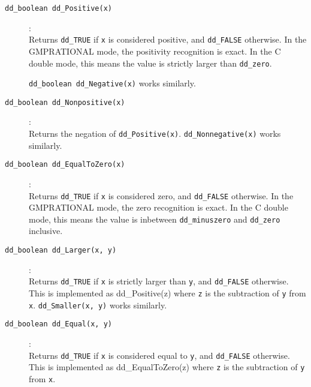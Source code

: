 \documentclass[11pt]{article}
\newcommand {\0} {{\bf 0}}
\begin{document}
\begin{description}

\item[{\tt dd\_boolean dd\_Positive(x)}]:\\
Returns {\tt dd\_TRUE} if {\tt x} is considered positive,  and  {\tt dd\_FALSE} otherwise.
In the GMPRATIONAL mode, the positivity recognition is exact.  In the C double mode,
this means the value is strictly larger than  {\tt dd\_zero}.

{\tt dd\_boolean dd\_Negative(x)} works similarly.

\item[{\tt dd\_boolean dd\_Nonpositive(x)}]:\\
Returns the negation of {\tt dd\_Positive(x)}.   {\tt dd\_Nonnegative(x)} works similarly.

\item[{\tt dd\_boolean dd\_EqualToZero(x)}]:\\
Returns {\tt dd\_TRUE} if {\tt x} is considered zero,  and  {\tt dd\_FALSE} otherwise.
In the GMPRATIONAL mode, the zero recognition is exact.  In the C double mode,
this means the value is inbetween {\tt dd\_minuszero} and  {\tt dd\_zero}
inclusive.

\item[{\tt dd\_boolean dd\_Larger(x, y)}]:\\
Returns {\tt dd\_TRUE} if {\tt x} is strictly larger than {\tt y},  and  {\tt dd\_FALSE} otherwise.
This is implemented as {dd\_Positive(z)} where {\tt z} is the subtraction of {\tt y}
from {\tt x}.
{\tt dd\_Smaller(x, y)} works similarly.

\item[{\tt dd\_boolean dd\_Equal(x, y)}]:\\
Returns {\tt dd\_TRUE} if {\tt x} is considered equal to  {\tt y},  and  {\tt dd\_FALSE} otherwise.
This is implemented as {dd\_EqualToZero(z)} where {\tt z} is the subtraction of {\tt y}
from {\tt x}.
\end{description}
\end{document}
